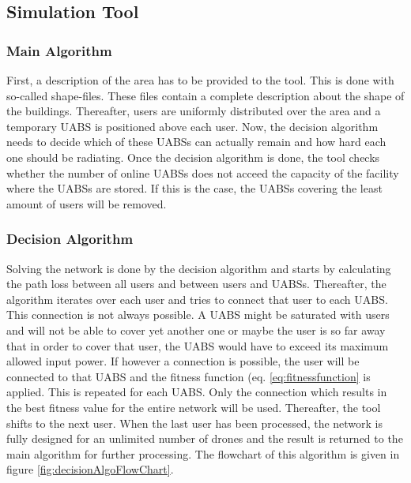 \documentclass[twocolumn]{phdsymp} %
\begin{document}
\subsection{Simulation Tool}

\subsubsection{Main Algorithm}
First, a description of the area has to be provided to the tool. This is done with so-called shape-files.
These  files contain a complete description about the shape of the buildings. Thereafter, users are uniformly
distributed over the area and a temporary \gls{UABS} is positioned above each user. Now, the decision algorithm
needs to decide which of these \gls{UABS}s can actually remain and how hard each one should be radiating. Once the 
decision algorithm is done, the tool checks whether the number of online \gls{UABS}s does not acceed the capacity of 
the facility where the \gls{UABS}s are stored. If this is the case, the \gls{UABS}s covering the least amount of users 
will be removed.

\subsubsection{Decision Algorithm}

Solving the network is done by the decision algorithm and starts by calculating the path loss between all users and between users and \gls{UABS}s.
Thereafter, the algorithm iterates over each user and tries to connect that user to each \gls{UABS}. This connection is not always possible. A \gls{UABS} might be saturated with users and 
will not be able to cover yet another one or maybe the user is so far away that in order to cover that user, the \gls{UABS} would have to exceed its maximum allowed input power.
If however a connection is possible, the user will be connected to that \gls{UABS} and the fitness function (eq. \ref{eq:fitnessfunction} is applied. 
This is repeated for each \gls{UABS}. Only the connection which results in the best fitness value for the entire network will be used. Thereafter, the tool shifts to the next user. 
When the last user has been processed, the network is fully designed for an unlimited number of drones and the result is returned to the main algorithm for further processing.
The flowchart of this algorithm is given in figure \ref{fig:decisionAlgoFlowChart}.

\end{document}

